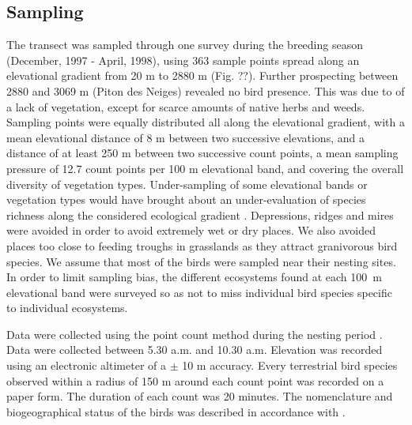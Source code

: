 \documentclass{article}
\begin{document}
\subsection*{Sampling}
The transect was sampled through one survey during the breeding season (December, 1997 - April, 1998), using 363 sample points spread along an elevational gradient from 20 m to 2880 m (Fig. ??). Further prospecting between 2880 and 3069 m (Piton des Neiges) revealed no bird presence. This was due to of a lack of vegetation, except for scarce amounts of native herbs and weeds. Sampling points were equally distributed all along the elevational gradient, with a mean elevational distance of 8 m between two successive elevations, and a distance of at least 250 m between two successive count points, a mean sampling pressure of 12.7 count points per 100 m elevational band, and covering the overall diversity of vegetation types. Under-sampling of some elevational bands or vegetation types would have brought about an under-evaluation of species richness along the considered ecological gradient \citep{Prodon1981,Rahbek1997,Patterson1998}. Depressions, ridges and mires were avoided in order to avoid extremely wet or dry places. We also avoided places too close to feeding troughs in grasslands as they attract granivorous bird species. We assume that most of the birds were sampled near their nesting sites. In order to limit sampling bias, the different ecosystems found at each 100~m elevational band were surveyed so as not to miss individual bird species specific to individual ecosystems. 


Data were collected using the point count method during the nesting period \citep{Blondel1970}. Data were collected between 5.30 a.m. and 10.30 a.m. Elevation was recorded using an electronic altimeter of a $\pm$ 10 m accuracy. Every terrestrial bird species observed within a radius of 150 m around each count point was recorded on a paper form. The duration of each count was 20 minutes. The nomenclature and biogeographical status of the birds was described in accordance with \citep{Sinclair1998}.
\end{document}
